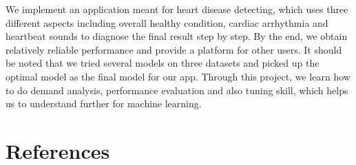 \documentclass[letterpaper]{article} %
\begin{document}
We implement an application meant for heart disease detecting, which uses three different aspects including overall healthy condition, cardiac arrhythmia and heartbeat sounds to diagnose the final result step by step. By the end, we obtain relatively reliable performance and provide a platform for other users. It should be noted that we tried several  models on three datasets and picked up the optimal model as the final model for our app. Through this project, we learn how to do demand analysis, performance evaluation and also tuning skill, which helps us to understand further for machine learning.

\section{References}
\end{document}
